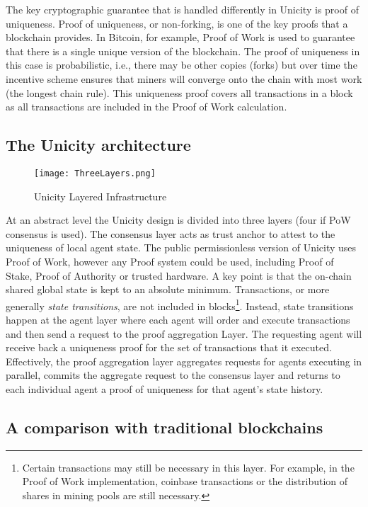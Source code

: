 \documentclass{article}
\begin{document}
The key cryptographic guarantee that is handled differently in Unicity is proof of uniqueness. Proof of uniqueness, or non-forking, is one of the key proofs that a blockchain provides. In Bitcoin, for example, Proof of Work is used to guarantee that there is a single unique version of the blockchain. The proof of uniqueness in this case is probabilistic, i.e., there may be other copies (forks) but over time the incentive scheme ensures that miners will converge onto the chain with most work (the longest chain rule). This uniqueness proof covers all transactions in a block as all transactions are included in the Proof of Work calculation.

\subsection{The Unicity architecture}

\begin{figure}[htbp]
    \centering
    \texttt{[image: ThreeLayers.png]}
    \caption{Unicity Layered Infrastructure}
    \label{fig:layers}
\end{figure}

At an abstract level the Unicity design is divided into three layers (four if PoW consensus is used). The consensus layer acts as trust anchor to attest to the uniqueness of local agent state. The public permissionless version of Unicity uses Proof of Work, however any Proof system could be used, including Proof of Stake, Proof of Authority or trusted hardware. A key point is that the on-chain shared global state is kept to an absolute minimum. Transactions, or more generally \textit{state transitions}, are not included in blocks\footnote{Certain transactions may still be necessary in this layer. For example, in the Proof of Work implementation, coinbase transactions or the distribution of shares in mining pools are still necessary.}.
Instead, state transitions happen at the agent layer where each agent will order and execute transactions and then send a request to the proof aggregation Layer. The requesting agent will receive back a uniqueness proof for the set of transactions that it executed. Effectively, the proof aggregation layer aggregates requests for agents executing in parallel,  commits the aggregate request to the consensus layer and returns to each individual agent a proof of uniqueness for that agent's state history.



\subsection{A comparison with traditional blockchains}
\end{document}
